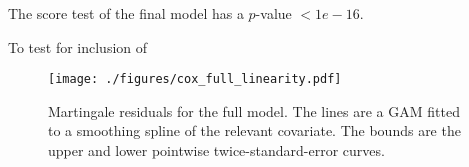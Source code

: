 \documentclass[11pt,a4paper]{article}
\begin{document}




The score test of the final model has a $p$-value $< 1e-16$.





To test for inclusion of 

\begin{figure}[h!tb]
    \begin{center}
        \texttt{[image: ./figures/cox\_full\_linearity.pdf]}
    \end{center}
    \vspace{-0.8cm}
    \caption{Martingale residuals for the full model. The lines are a GAM fitted to a smoothing spline of the relevant covariate. The bounds are the upper and lower pointwise twice-standard-error curves.}
    \label{fig:cox_full_linearity}
\end{figure}











\cleardoublepage{}
{}
%
%
%
%



%
%
\end{document}
